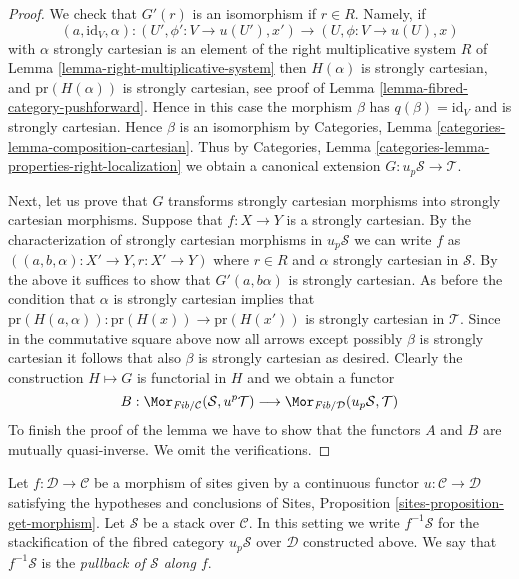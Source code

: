 \begin{proof}
\medskip\noindent
We check that $G'(r)$ is an isomorphism if $r \in R$.
Namely, if
$$
(a, \text{id}_V, \alpha) :
(U', \phi' : V \to u(U'), x')
\longrightarrow
(U, \phi : V \to u(U), x)
$$
with $\alpha$ strongly cartesian is an element of the right multiplicative
system $R$ of
Lemma \ref{lemma-right-multiplicative-system}
then $H(\alpha)$ is strongly cartesian, and
$\text{pr}(H(\alpha))$ is strongly cartesian, see proof of
Lemma \ref{lemma-fibred-category-pushforward}.
Hence in this case the morphism $\beta$ has $q(\beta) = \text{id}_V$
and is strongly cartesian. Hence $\beta$ is an isomorphism by
Categories, Lemma \ref{categories-lemma-composition-cartesian}.
Thus by
Categories, Lemma \ref{categories-lemma-properties-right-localization}
we obtain a canonical extension $G : u_p\mathcal{S} \to \mathcal{T}$.

\medskip\noindent
Next, let us prove that $G$ transforms strongly cartesian morphisms
into strongly cartesian morphisms.
Suppose that $f : X \to Y$ is a strongly cartesian. By the characterization
of strongly cartesian morphisms in $u_p\mathcal{S}$ we can write $f$ as
$((a, b, \alpha) : X' \to Y, r : X' \to Y)$ where $r \in R$ and
$\alpha$ strongly cartesian in $\mathcal{S}$. By the above it suffices
to show that $G'(a, b \alpha)$ is strongly cartesian. As before
the condition that $\alpha$ is strongly cartesian implies that
$\text{pr}(H(a, \alpha)) : \text{pr}(H(x)) \to \text{pr}(H(x'))$
is strongly cartesian in $\mathcal{T}$. Since in the commutative
square above now all arrows except possibly $\beta$ is strongly cartesian
it follows that also $\beta$ is strongly cartesian as desired.
Clearly the construction $H \mapsto G$ is functorial in $H$ and we
obtain a functor
$$
B :
\Mor_{\textit{Fib}/\mathcal{C}}(\mathcal{S}, u^p\mathcal{T})
\longrightarrow
\Mor_{\textit{Fib}/\mathcal{D}}(u_p\mathcal{S}, \mathcal{T})
$$
To finish the proof of the lemma we have to show that the functors
$A$ and $B$ are mutually quasi-inverse. We omit the verifications.
\end{proof}

\begin{definition}
\label{definition-pullback-stack}
Let $f : \mathcal{D} \to \mathcal{C}$ be a morphism of sites
given by a continuous functor $u : \mathcal{C} \to \mathcal{D}$
satisfying the hypotheses and conclusions of
Sites, Proposition \ref{sites-proposition-get-morphism}.
Let $\mathcal{S}$ be a stack over $\mathcal{C}$.
In this setting we write {\it $f^{-1}\mathcal{S}$} for the stackification
of the fibred category $u_p\mathcal{S}$ over $\mathcal{D}$ constructed
above. We say that $f^{-1}\mathcal{S}$ is the
{\it pullback of $\mathcal{S}$ along $f$}.
\end{definition}

